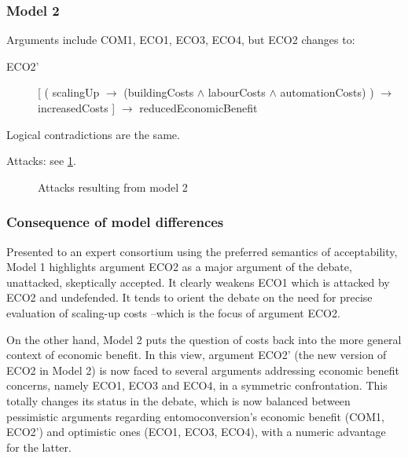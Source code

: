 \documentclass[version=3.21, pagesize, twoside=off, bibliography=totoc, DIV=calc, fontsize=12pt, a4paper, french, english]{scrartcl}
\begin{document}
\subsubsection{Model 2}
Arguments include COM1, ECO1, ECO3, ECO4, but ECO2 changes to:
\begin{description}
	\item[ECO2’] [ ( scalingUp $→$ (buildingCosts $\land$ labourCosts $\land$ automationCosts) ) $→$ increasedCosts ] $→$ reducedEconomicBenefit
\end{description}

Logical contradictions are the same.

Attacks: see \cref{fig:m2}.
\begin{figure}
	\caption{Attacks resulting from model 2}
	\label{fig:m2}
\end{figure}

\subsubsection{Consequence of model differences}
Presented to an expert consortium \citep{Insect4City2020} using the preferred semantics of acceptability, Model 1 highlights argument ECO2 as a major argument of the debate, unattacked, skeptically accepted. It clearly weakens ECO1 which is attacked by ECO2 and undefended. It tends to orient the debate on the need for precise evaluation of scaling-up costs --which is the focus of argument ECO2.

On the other hand, Model 2 puts the question of costs back into the more general context of economic benefit. In this view, argument ECO2' (the new version of ECO2 in Model 2) is now faced to several arguments addressing economic benefit concerns, namely ECO1, ECO3 and ECO4, in a symmetric confrontation. This totally changes its status in the debate, which is now balanced between pessimistic arguments regarding entomoconversion's economic benefit (COM1, ECO2') and optimistic ones (ECO1, ECO3, ECO4), with a numeric advantage for the latter.
\end{document}
